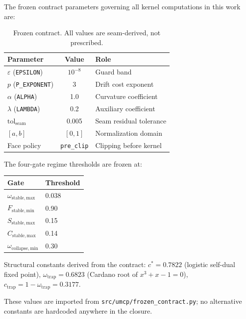 \documentclass[
  aps,
  prd,
  twocolumn,
  superscriptaddress,
  nofootinbib,
  floatfix
]{revtex4-2}
\newcommand{\eps}{\varepsilon}
\begin{document}
The frozen contract parameters governing all kernel
computations in this work are:

\begin{table}[h]
\caption{\label{tab:contract}Frozen contract.
All values are seam-derived, not prescribed.}
\small
\begin{ruledtabular}
\begin{tabular}{lcl}
Parameter & Value & Role \\
\hline
$\eps$ (\texttt{EPSILON}) & $10^{-8}$ &
  Guard band  \\
$p$ (\texttt{P\_EXPONENT}) & 3 &
  Drift cost exponent \\
$\alpha$ (\texttt{ALPHA}) & 1.0 &
  Curvature coefficient \\
$\lambda$ (\texttt{LAMBDA}) & 0.2 &
  Auxiliary coefficient \\
$\mathrm{tol}_{\mathrm{seam}}$ & 0.005 &
  Seam residual tolerance \\
$[a, b]$ & $[0, 1]$ &
  Normalization domain \\
Face policy & \texttt{pre\_clip} &
  Clipping before kernel \\
\end{tabular}
\end{ruledtabular}
\end{table}

The four-gate regime thresholds are frozen at:
\begin{center}
\small
\begin{tabular}{ll}
\toprule
Gate & Threshold \\
\midrule
$\omega_{\mathrm{stable,max}}$ & 0.038 \\
$F_{\mathrm{stable,min}}$ & 0.90 \\
$S_{\mathrm{stable,max}}$ & 0.15 \\
$C_{\mathrm{stable,max}}$ & 0.14 \\
$\omega_{\mathrm{collapse,min}}$ & 0.30 \\
\bottomrule
\end{tabular}
\end{center}

Structural constants derived from the contract:
$c^{*} = 0.7822$ (logistic self-dual fixed point),
$\omega_{\mathrm{trap}} = 0.6823$ (Cardano root of
$x^3 + x - 1 = 0$),
$c_{\mathrm{trap}} = 1 - \omega_{\mathrm{trap}} = 0.3177$.

These values are imported from
\texttt{src/umcp/frozen\_contract.py}; no alternative
constants are hardcoded anywhere in the closure.
\end{document}
